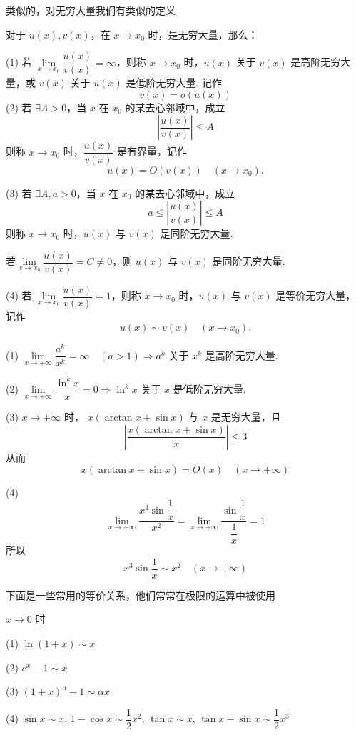 类似的，对无穷大量我们有类似的定义
\begin{definition}
	对于 $u(x), v(x)$，在 $x \to x_0$ 时，是无穷大量，那么：
	
	(1) 若 $\lim\limits_{x \to x_0} \dfrac{u(x)}{v(x)} = \infty$，则称 $x \to x_0$ 时，$u(x)$ 关于 $v(x)$ 是高阶无穷大量，或 $v(x)$ 关于 $u(x)$ 是低阶无穷大量.
	记作\[v(x)=o(u(x))\]
	(2) 若 $\exists A > 0$，当 $x$ 在 $x_0$ 的某去心邻域中，成立
	\[ \left| \frac{u(x)}{v(x)} \right| \leqslant A \]
	则称 $x \to x_0$ 时，$\dfrac{u(x)}{v(x)}$ 是有界量，记作
	\[ u(x) = O(v(x)) \quad (x \to x_0). \]
	
	(3) 若 $\exists A, a > 0$，当 $x$ 在 $x_0$ 的某去心邻域中，成立
	\[ a \leqslant \left| \frac{u(x)}{v(x)} \right| \leqslant A \]
	则称 $x \to x_0$ 时，$u(x)$ 与 $v(x)$ 是同阶无穷大量.
	
	若$\lim\limits_{x \to x_0} \dfrac{u(x)}{v(x)} = C \neq 0$，则 $u(x)$ 与 $v(x)$ 是同阶无穷大量.
	
	(4) 若 $\lim\limits_{x \to x_0} \dfrac{u(x)}{v(x)} = 1$，则称 $x \to x_0$ 时，$u(x)$ 与 $v(x)$ 是等价无穷大量，记作
	\[ u(x) \sim v(x) \quad (x \to x_0). \]
	
\end{definition}
\begin{example}
	
	(1) $\lim\limits_{x \to +\infty} \dfrac{a^k}{x^k} = \infty \quad (a > 1) \Rightarrow a^k \text{ 关于 } x^k\text{ 是高阶无穷大量.}$
	
	(2) $\lim\limits_{x \to +\infty} \dfrac{\ln^k x}{x} = 0 \Rightarrow \ln^k x \text{ 关于 } x \text{ 是低阶无穷大量.}$
	
	(3) $x \to +\infty$ 时， $x(\arctan x + \sin x)$ 与 $x$ 是无穷大量，且
	\[ \left| \frac{x(\arctan x + \sin x)}{x} \right| \leqslant 3 \]
	从而
	\[ x(\arctan x + \sin x) = O(x) \quad (x \to +\infty) \]
	
	(4)$$\lim_{x \to +\infty} \dfrac{x^3 \sin \dfrac{1}{x}}{x^2} = \lim_{x \to +\infty} \dfrac{\sin \dfrac{1}{x}}{\dfrac{1}{x}} = 1 $$
	所以$$x^3 \sin \frac{1}{x} \sim x^2 \quad (x \to +\infty)$$
	
\end{example}
下面是一些常用的等价关系，他们常常在极限的运算中被使用
\begin{proposition}
	\( x \to 0 \) 时
	
	(1) \(\ln(1+x) \sim x\)
	
	(2) \(e^x - 1 \sim x\)
	
	(3) \((1+x)^\alpha - 1 \sim \alpha x\)
	
	(4) \(\sin x \sim x\), \(1 - \cos x \sim \dfrac{1}{2}x^2\), \(\tan x \sim x\), \(\tan x - \sin x \sim \dfrac{1}{2}x^3\)
\end{proposition}
